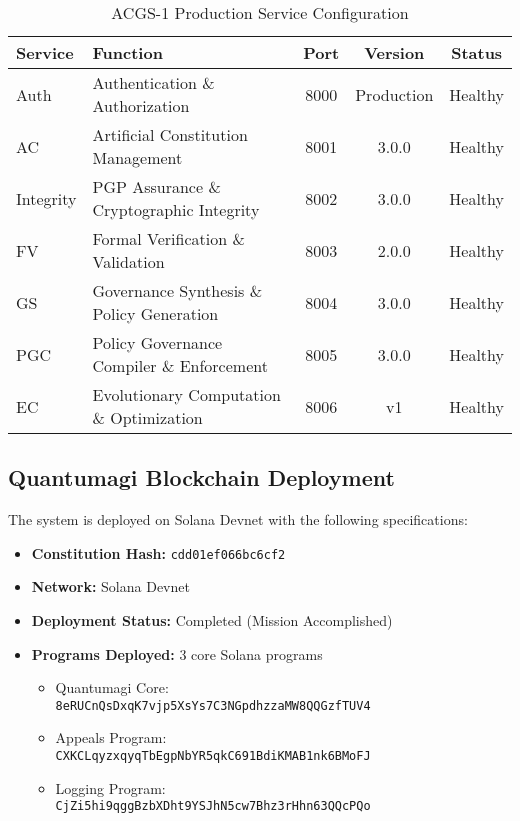 \begin{table}[H]
\centering
\caption{ACGS-1 Production Service Configuration}\label{tab:acgs_services}
\small
\begin{tabular}{@{}lp{4.5cm}ccc@{}}
\toprule
\textbf{Service} & \textbf{Function} & \textbf{Port} & \textbf{Version} & \textbf{Status} \\
\midrule
Auth & Authentication \& Authorization & 8000 & Production & Healthy \\
AC & Artificial Constitution Management & 8001 & 3.0.0 & Healthy \\
Integrity & PGP Assurance \& Cryptographic Integrity & 8002 & 3.0.0 & Healthy \\
FV & Formal Verification \& Validation & 8003 & 2.0.0 & Healthy \\
GS & Governance Synthesis \& Policy Generation & 8004 & 3.0.0 & Healthy \\
PGC & Policy Governance Compiler \& Enforcement & 8005 & 3.0.0 & Healthy \\
EC & Evolutionary Computation \& Optimization & 8006 & v1 & Healthy \\
\bottomrule
\end{tabular}
\end{table}

\subsection{Quantumagi Blockchain Deployment}
The \quantumagi{} system is deployed on Solana Devnet with the following specifications:

\begin{itemize}[leftmargin=*,topsep=2pt,itemsep=2pt,parsep=0pt]
    \item \textbf{Constitution Hash:} \texttt{cdd01ef066bc6cf2}
    \item \textbf{Network:} Solana Devnet
    \item \textbf{Deployment Status:} Completed (Mission Accomplished)
    \item \textbf{Programs Deployed:} 3 core Solana programs
    \begin{itemize}
        \item Quantumagi Core: \\
        {\small\texttt{8eRUCnQsDxqK7vjp5XsYs7C3NGpdhzzaMW8QQGzfTUV4}}
        \item Appeals Program: \\
        {\small\texttt{CXKCLqyzxqyqTbEgpNbYR5qkC691BdiKMAB1nk6BMoFJ}}
        \item Logging Program: \\
        {\small\texttt{CjZi5hi9qggBzbXDht9YSJhN5cw7Bhz3rHhn63QQcPQo}}
    \end{itemize}
\end{itemize}

